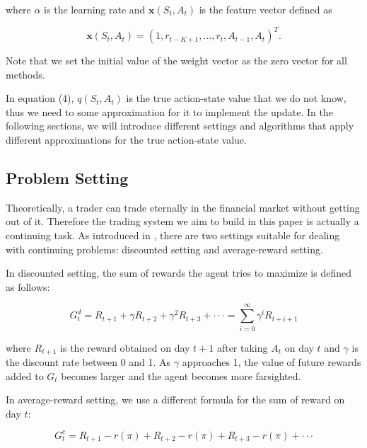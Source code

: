 \documentclass{article}
\begin{document}
\noindent where $\alpha$ is the learning rate and $\mathbf{x}\left ( S_{t}, A_{t} \right )$ is the feature vector defined as 

\begin{equation}
	\mathbf{x}\left ( S_{t}, A_{t} \right ) = \left ( 1, r_{t-K+1},..., r_{t}, A_{t-1}, A_{t} \right )^{T}.
\end{equation}

\noindent Note that we set the initial value of the weight vector as the zero vector for all methods.

\indent In equation (4), $q\left ( S_{t}, A_{t} \right )$ is the true action-state value that we do not know, thus we need to some approximation for it to implement the update. In the following sections, we will introduce different settings and algorithms that apply different approximations for the true action-state value. 

\subsection{Problem Setting} %

\noindent Theoretically, a trader can trade eternally in the financial market without getting out of it. Therefore the trading system we aim to build in this paper is actually a continuing task. As introduced in \cite{sutton2018reinforcement}, there are two settings suitable for dealing with continuing problems: discounted setting and average-reward setting.

\indent In discounted setting, the sum of rewards the agent tries to maximize is defined as follows:

\begin{equation}
	G_{t}^{d} = R_{t+1}+\gamma R_{t+2}+\gamma ^{2} R_{t+3}+\cdot \cdot \cdot =\sum_{i=0}^{\infty }\gamma ^{i}R_{t+i+1}
\end{equation}

\noindent where $R_{t+1}$ is the reward obtained on day $t+1$ after taking $A_{t}$ on day $t$ and $\gamma$ is the discount rate between 0 and 1. As $\gamma$ approaches 1, the value of future rewards added to $G_{t}$ becomes larger and the agent becomes more farsighted.

\indent In average-reward setting, we use a different formula for the sum of reward on day $t$:

\begin{equation}
	G_{t}^{c} = R_{t+1}-r\left ( \pi  \right )+R_{t+2}-r\left ( \pi  \right )+R_{t+3}-r\left ( \pi  \right )+\cdot \cdot \cdot 
\end{equation}
\end{document}
